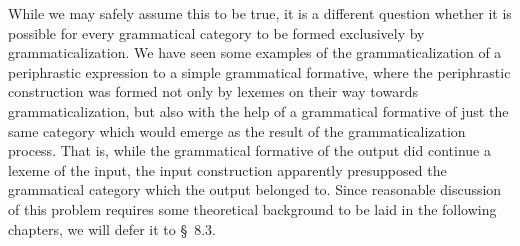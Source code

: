 While we may safely assume this to be true, it is a different question whether it is possible for every grammatical category to be formed exclusively by grammaticalization. We have seen some examples of the grammaticalization of a periphrastic expression to a simple grammatical formative, where the periphrastic construction was formed not only by lexemes on their way towards grammaticalization, but also with the help of a grammatical formative of just the same category which would emerge as the result of the grammaticalization process. That is, while the grammatical formative of the output did continue a lexeme of the input, the input construction apparently presupposed the grammatical category which the output belonged to. Since reasonable discussion of this problem requires some theoretical background to be laid in the following chapters, we will defer it to §~8.3.
